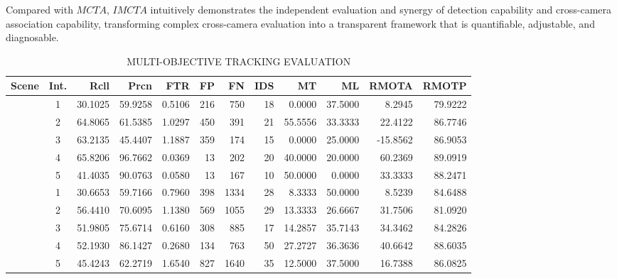 \documentclass[journal,twoside,web]{ieeecolor}
\begin{document}
Compared with \(MCTA\), \(IMCTA\) intuitively demonstrates the independent evaluation and synergy of detection capability and cross-camera association capability, transforming complex cross-camera evaluation into a transparent framework that is quantifiable, adjustable, and diagnosable. 

\begin{table}[t]
	\centering
	\caption{MULTI-OBJECTIVE TRACKING EVALUATION}
	\label{tab:2}
	\small
	\begin{tabular}{@{}l@{\hspace{1em}}c@{\hspace{0.5em}}*{10}{r}@{}}
		\toprule
		\textbf{Scene} & \textbf{Int.} & \textbf{Rcll} & \textbf{Prcn} & \textbf{FTR} & \textbf{FP} & \textbf{FN} & \textbf{IDS} & \textbf{MT} & \textbf{ML} & \textbf{RMOTA} & \textbf{RMOTP} \\
		\midrule
		& 1 & 30.1025 & 59.9258 & 0.5106 & 216 & 750 & 18 & 0.0000 & 37.5000 & 8.2945 & 79.9222\\
		& 2 & 64.8065 & 61.5385 & 1.0297 & 450 & 391 & 21 & 55.5556 & 33.3333 & 22.4122 & 86.7746\\
		& 3 & 63.2135 & 45.4407 & 1.1887 & 359 & 174 & 15 & 0.0000 & 25.0000 & -15.8562 & 86.9053\\
		& 4 & 65.8206 & 96.7662 & 0.0369 & 13 & 202 & 20 & 40.0000 & 20.0000 & 60.2369 & 89.0919\\
		& 5 & 41.4035 & 90.0763 & 0.0580 & 13 & 167 & 10 & 50.0000 & 0.0000 & 33.3333 & 88.2471\\
		\midrule
		& 1 & 30.6653 & 59.7166 & 0.7960 & 398 & 1334 & 28 & 8.3333 & 50.0000 & 8.5239 & 84.6488\\
		& 2 & 56.4410 & 70.6095 & 1.1380 & 569 & 1055 & 29 & 13.3333 & 26.6667 & 31.7506 & 81.0920\\
		& 3 & 51.9805 & 75.6714 & 0.6160 & 308 & 885 & 17 & 14.2857 & 35.7143 & 34.3462 & 84.2826\\
		& 4 & 52.1930 & 86.1427 & 0.2680 & 134 & 763 & 50 & 27.2727 & 36.3636 & 40.6642 & 88.6035\\
		& 5 & 45.4243 & 62.2719 & 1.6540 & 827 & 1640 & 35 & 12.5000 & 37.5000 & 16.7388 & 86.0825\\
		\bottomrule
	\end{tabular}
\end{table}
\end{document}
